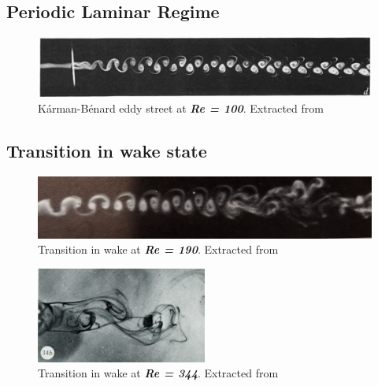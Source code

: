 \documentclass[journal]{new-aiaa}
\begin{document}
\subsection{Periodic Laminar Regime}


\begin{figure}[H]
\begin{center}
\includegraphics[width=1\textwidth]{Images/federico/Figure02}
\caption{Kárman-Bénard eddy street at \textbf{\textit{Re = 100}}. Extracted from \cite{Zdravkovich1968} }
\label{fig:Laminar}
\end{center}
\end{figure}

\subsection{Transition in wake state}

\begin{figure}[H]
\begin{center}
\includegraphics[width=1\textwidth]{Images/federico/Figure03}
\caption{Transition in wake at \textbf{\textit{Re = 190}}. Extracted from \cite{Zdravkovich1968} }
\label{fig:TrW1}
\end{center}
\end{figure}

\begin{figure}[H]
\begin{center}
\includegraphics[width=0.5\textwidth]{Images/federico/Figure04}
\caption{Transition in wake at \textbf{\textit{Re = 344}}. Extracted from \cite{Gerrard1978} }
\label{fig:TrW2}
\end{center}
\end{figure}
\end{document}
